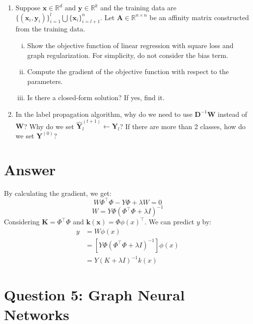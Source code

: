 \documentclass[
	12pt, %
]{fphw}
\begin{document}
\begin{problem}
	\begin{enumerate}
	\item
    Suppose $\mathbf{x}\in\mathbb{R}^d$ and $\mathbf{y}\in\mathbb{R}^k$ and the training data are $\{(\mathbf{x}_i,\mathbf{y}_i)\}_{i=1}^l\bigcup\{\mathbf{x}_i\}_{i=l+1}^n$. Let $\mathbf{A}\in\mathbb{R}^{n\times n}$ be an affinity matrix constructed from the training data. 
	\begin{enumerate}[i)]
	\item Show the objective function of linear regression with square loss and graph regularization. For simplicity, do not consider the bias term. 
	\item Compute the gradient of the objective function with respect to the parameters. 
	\item Is there a closed-form solution? If yes, find it.
\end{enumerate}
    \item In the label propagation algorithm, why do we need to use $\mathbf{D}^{-1}\mathbf{W}$ instead of $\mathbf{W}$? Why do we set $\hat{\mathbf{Y}}_l^{(t+1)} \leftarrow \mathbf{Y}_l$? If there are more than 2 classes, how do we set $\mathbf{Y}^{(0)}$? 
\end{enumerate}
\end{problem}
\section*{Answer}
By calculating the gradient, we get:
\begin{equation*}
	W \Phi^{\top}\Phi - Y\Phi + \lambda W = 0
\end{equation*}
\begin{equation*}
	W = Y \Phi (\Phi^{\top}\Phi + \lambda I)^{-1}
\end{equation*}
Considering $\mathbf{K} = \Phi^\top\Phi$ and $\mathbf{k}(\mathbf{x}) = \Phi\phi(x)^\top$.
We can predict $y$ by:
\begin{equation*}
	\begin{aligned}
		y &= W\phi(x) \\
		  &= [Y \Phi (\Phi^{\top}\Phi + \lambda I)^{-1}]\phi(x) \\
		  &= Y(K + \lambda I)^{-1}k(x)
	\end{aligned}
\end{equation*}
\section*{Question 5: Graph Neural Networks}
\end{document}
